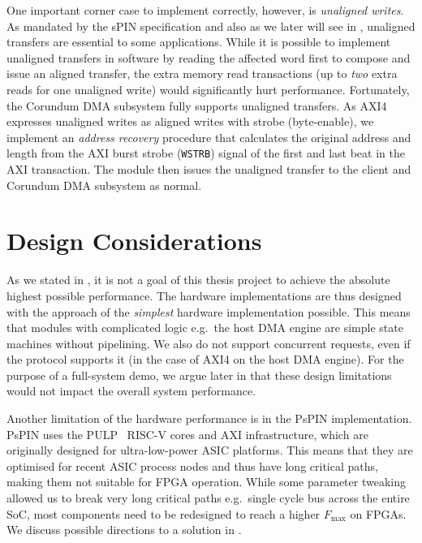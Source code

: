 One important corner case to implement correctly, however, is \emph{unaligned writes}.  As mandated by the sPIN specification and also as we later will see in , unaligned transfers are essential to some applications.  While it is possible to implement unaligned transfers in software by reading the affected word first to compose and issue an aligned transfer, the extra memory read transactions (up to \emph{two} extra reads for one unaligned write) would significantly hurt performance.  Fortunately, the Corundum DMA subsystem fully supports unaligned transfers.  As AXI4 expresses unaligned writes as aligned writes with strobe (byte-enable), we implement an \emph{address recovery} procedure that calculates the original address and length from the AXI burst strobe (\texttt{WSTRB}) signal of the first and last beat in the AXI transaction.  The module then issues the unaligned transfer to the client and Corundum DMA subsystem as normal.

\section{Design Considerations} \label{sec:hw-design-considerations}

As we stated in , it is not a goal of this thesis project to achieve the absolute highest possible performance.  The hardware implementations are thus designed with the approach of the \emph{simplest} hardware implementation possible.  This means that modules with complicated logic e.g.\ the host DMA engine are simple state machines without pipelining.  We also do not support concurrent requests, even if the protocol supports it (in the case of AXI4 on the host DMA engine).  For the purpose of a full-system demo, we argue later in  that these design limitations would not impact the overall system performance.

Another limitation of the hardware performance is in the PsPIN implementation.  PsPIN uses the PULP~\cite{rossi_pulp_2015} RISC-V cores and AXI infrastructure, which are originally designed for ultra-low-power ASIC platforms.  This means that they are optimised for recent ASIC process nodes and thus have long critical paths, making them not suitable for FPGA operation.  While some parameter tweaking allowed us to break very long critical paths e.g.\ single cycle bus across the entire SoC, most components need to be redesigned to reach a higher $F_{\text{max}}$ on FPGAs.  We discuss possible directions to a solution in .

